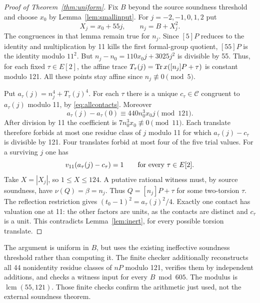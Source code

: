 \documentclass[11pt,a4paper]{article}
\begin{document}
\begin{proof}[Proof of Theorem~\ref{thm:uniform}]
Fix $B$ beyond the source soundness threshold and choose $x_0$ by
Lemma~\ref{lem:smallinput}. For $j=-2,-1,0,1,2$ put
\[
 X_j=x_0+55j,\qquad n_j=B+X_j^2.
\]
The congruences in that lemma remain true for $n_j$.
Since $[5]P$ reduces to the identity and multiplication by 11 kills the
first formal-group quotient, $[55]P$ is the identity modulo $11^2$.
But $n_j-n_0=110x_0j+3025j^2$ is divisible by 55. Thus, for each fixed
$\tau\in E[2]$, the affine trace
$T_\tau(j)=\operatorname{Tr} x([n_j]P+\tau)$ is constant modulo 121.
All these points stay affine since $n_j\not\equiv0\pmod5$.

Put $a_\tau(j)=n_j^4+T_\tau(j)^4$. For each $\tau$ there is a unique
$c_\tau\in\mathcal C$ congruent to $a_\tau(j)$ modulo 11, by
\eqref{eq:allcontacts}. Moreover
\[
 a_\tau(j)-a_\tau(0)\equiv440n_0^3x_0j\pmod {121}.
\]
After division by 11 the coefficient is
$7n_0^3x_0\not\equiv0\pmod {11}$. Each translate therefore forbids
at most one residue class of $j$ modulo 11 for which
$a_\tau(j)-c_\tau$ is divisible by 121. Four translates forbid at most
four of the five trial values. For a surviving $j$ one has
\[
                    v_{11}(a_\tau(j)-c_\tau)=1
                         \qquad\hbox{for every }\tau\in E[2].
\]
Take $X=|X_j|$, so $1\le X\le124$. A putative rational witness must,
by source soundness, have $\nu(Q)=\beta=n_j$. Thus
$Q=[n_j]P+\tau$ for some two-torsion $\tau$.
The reflection restriction gives $(t_0-1)^2=a_\tau(j)^2/4$.
Exactly one contact has valuation one at 11: the other factors are units,
as the contacts are distinct and $c_\tau$ is a unit. This contradicts
Lemma~\ref{lem:inert}, for every possible torsion translate.
\end{proof}

The argument is uniform in $B$, but uses the existing ineffective soundness
threshold rather than computing it. The finite checker additionally
reconstructs all 44 nonidentity residue classes of $nP$ modulo 121,
verifies them by independent additions, and checks a witness input for
every $B\bmod605$. The modulus is $\operatorname{lcm}(55,121)$.
Those finite checks confirm the arithmetic just used, not the external
soundness theorem.
\end{document}
